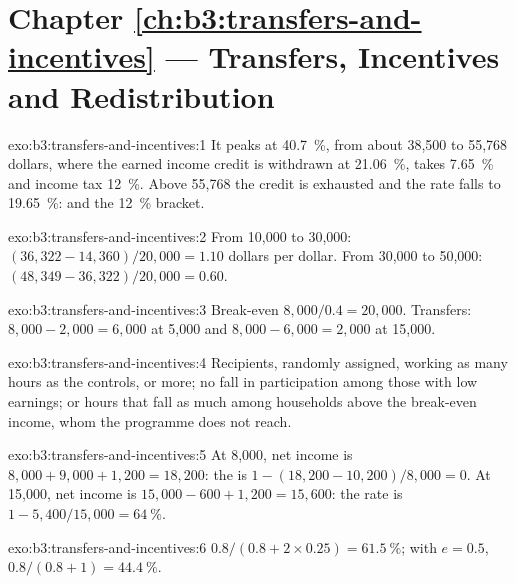 \section*{Chapter \ref{ch:b3:transfers-and-incentives} --- Transfers, Incentives and Redistribution}

\begin{solution}{exo:b3:transfers-and-incentives:1}
It peaks at 40.7~\%, from about 38{,}500 to 55{,}768 dollars, where the earned income credit
is withdrawn at 21.06~\%,  takes 7.65~\% and income tax 12~\%. Above 55{,}768 the
credit is exhausted and the rate falls to 19.65~\%:  and the 12~\% bracket.
\end{solution}

\begin{solution}{exo:b3:transfers-and-incentives:2}
From 10{,}000 to 30{,}000: $(36{,}322 - 14{,}360)/20{,}000 = 1.10$ dollars per dollar. From 30{,}000 to
50{,}000: $(48{,}349 - 36{,}322)/20{,}000 = 0.60$. %
\end{solution}

\begin{solution}{exo:b3:transfers-and-incentives:3}
Break-even $8{,}000/0.4 = 20{,}000$. Transfers: $8{,}000 - 2{,}000 = 6{,}000$ at 5{,}000 and $8{,}000 - 6{,}000 = 2{,}000$ at
15{,}000.
\end{solution}

\begin{solution}{exo:b3:transfers-and-incentives:4}
Recipients, randomly assigned, working as many hours as the controls, or more;
no fall in participation among those with low earnings; or hours that fall as much
among households above the break-even income, whom the programme does not reach.
\end{solution}

\begin{solution}{exo:b3:transfers-and-incentives:5}
At 8{,}000, net income is $8{,}000 + 9{,}000 + 1{,}200 = 18{,}200$: the  is
$1 - (18{,}200 - 10{,}200)/8{,}000 = 0$. At 15{,}000, net income is $15{,}000 - 600 + 1{,}200 = 15{,}600$: the rate is
$1 - 5{,}400/15{,}000 = 64~\%$. %
\end{solution}

\begin{solution}{exo:b3:transfers-and-incentives:6}
$0.8/(0.8 + 2 \times 0.25) = 61.5~\%$; with $e = 0.5$, $0.8/(0.8 + 1) = 44.4~\%$.
\end{solution}

